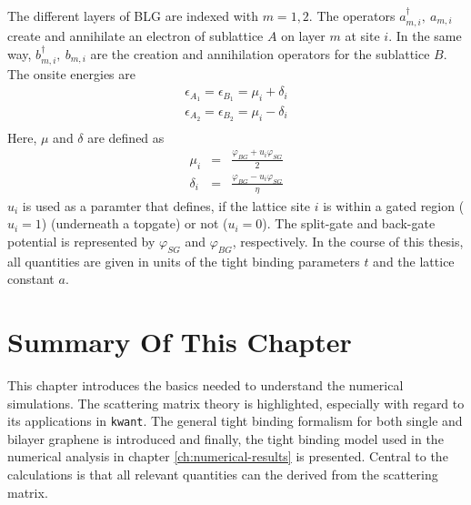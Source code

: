 The different layers of BLG are indexed with $m = 1, 2$. The operators $a^\dagger_{m, i},\ a_{m, i}$ create and annihilate an electron of sublattice $A$ on layer $m$ at site $i$. In the same way, $b^\dagger_{m, i},\ b_{m, i}$ are the creation and annihilation operators for the sublattice $B$.
The onsite energies are
\begin{eqnarray}
\epsilon_{A_1} = \epsilon_{B_1} = \mu_i + \delta_i \\
\epsilon_{A_2} = \epsilon_{B_2} = \mu_i - \delta_i \\
\end{eqnarray}
Here, $\mu$ and $\delta$ are defined as 
\begin{eqnarray}
\mu_i &=& \frac{\varphi_{BG} + u_i \varphi_{SG}}{2} \\
\delta_i &=& \frac{\varphi_{BG} -  u_i \varphi_{SG}}{\eta}
\end{eqnarray}
$u_i$ is used as a paramter that defines, if the lattice site $i$ is within a gated region ($u_i = 1$) (underneath a topgate) or not ($u_i = 0$). The split-gate and back-gate potential is represented by  $\varphi_{SG}$ and $ \varphi_{BG}$, respectively. In the course of this thesis, all quantities are given in units of the tight binding parameters $t$ and the lattice constant $a$.

\section{Summary Of This Chapter}
This chapter introduces the basics needed to understand the numerical simulations. The scattering matrix theory is highlighted, especially with regard to its applications in \texttt{kwant}. The general tight binding formalism for both single and bilayer graphene is introduced and finally, the tight binding model used in the numerical analysis in chapter \ref{ch:numerical-results} is presented. Central to the calculations is that all relevant quantities can the derived from the scattering matrix.